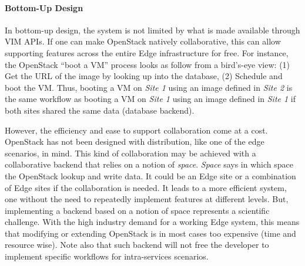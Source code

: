 


\paragraph{Bottom-Up Design}
In bottom-up design, the system is not limited by what is
made available through VIM APIs. If one can make OpenStack natively
collaborative, this can allow supporting features across the entire
Edge infrastructure for free. For instance, the OpenStack ``boot a
VM'' process looks as follow from a bird's-eye view: (1) Get the URL
of the image by looking up into the database, (2) Schedule and boot
the VM. Thus, booting a VM on \emph{Site 1} using an image defined in
\emph{Site 2} is the same workflow as booting a VM on \emph{Site 1}
using an image defined in \emph{Site 1} if both sites shared the same
data (\ie database backend).

However, the efficiency and ease to support collaboration come at a
cost. OpenStack has not been designed with distribution, like one of
the edge scenarios, in mind. This kind of collaboration may be
achieved with a collaborative backend that relies on a notion of
\emph{space}. \emph{Space} says in which space the OpenStack lookup
and write data. It could be an Edge site or a combination of Edge
sites if the collaboration is needed. It leads to a more efficient
system, one without the need to repeatedly implement features at
different levels. But, implementing a backend based on a notion of
space represents a scientific challenge. With the high industry demand
for a working Edge system, this means that modifying or extending
OpenStack is in most cases too expensive (time and resource wise).
Note also that such backend will not free the developer to implement
specific workflows for intra-services scenarios.


